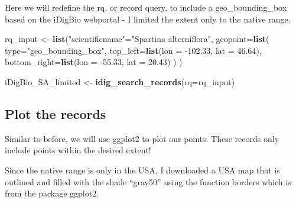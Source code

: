 \documentclass[
]{book}
\newenvironment{Shaded}{\begin{snugshade}}{\end{snugshade}}
\newcommand{\DataTypeTok}[1]{\textcolor[rgb]{0.13,0.29,0.53}{#1}}
\newcommand{\FloatTok}[1]{\textcolor[rgb]{0.00,0.00,0.81}{#1}}
\newcommand{\KeywordTok}[1]{\textcolor[rgb]{0.13,0.29,0.53}{\textbf{#1}}}
\newcommand{\NormalTok}[1]{#1}
\newcommand{\StringTok}[1]{\textcolor[rgb]{0.31,0.60,0.02}{#1}}
\begin{document}
Here we will redefine the rq, or record query, to include a geo\_bounding\_box based on the iDigBio webportal - I limited the extent only to the native range.

\begin{Shaded}
\begin{Highlighting}[]
\NormalTok{rq\_input \textless{}{-}}\StringTok{ }\KeywordTok{list}\NormalTok{(}\StringTok{"scientificname"}\NormalTok{=}\StringTok{"Spartina alterniflora"}\NormalTok{,}
                 \DataTypeTok{geopoint=}\KeywordTok{list}\NormalTok{( }\DataTypeTok{type=}\StringTok{"geo\_bounding\_box"}\NormalTok{,}
                                \DataTypeTok{top\_left=}\KeywordTok{list}\NormalTok{(}\DataTypeTok{lon =} \FloatTok{{-}102.33}\NormalTok{, }\DataTypeTok{lat =} \FloatTok{46.64}\NormalTok{),}
                                \DataTypeTok{bottom\_right=}\KeywordTok{list}\NormalTok{(}\DataTypeTok{lon =} \FloatTok{{-}55.33}\NormalTok{, }\DataTypeTok{lat =} \FloatTok{20.43}\NormalTok{) ) )}
\end{Highlighting}
\end{Shaded}

\begin{Shaded}
\begin{Highlighting}[]
\NormalTok{iDigBio\_SA\_limited \textless{}{-}}\StringTok{ }\KeywordTok{idig\_search\_records}\NormalTok{(}\DataTypeTok{rq=}\NormalTok{rq\_input)}
\end{Highlighting}
\end{Shaded}

\hypertarget{plot-the-records-1}{%
\subsection*{Plot the records}\label{plot-the-records-1}}

Similar to before, we will use ggplot2 to plot our points. These records only include points within the desired extent!

Since the native range is only in the USA, I downloaded a USA map that is outlined and filled with the shade ``gray50'' using the function borders which is from the package ggplot2.
\end{document}
